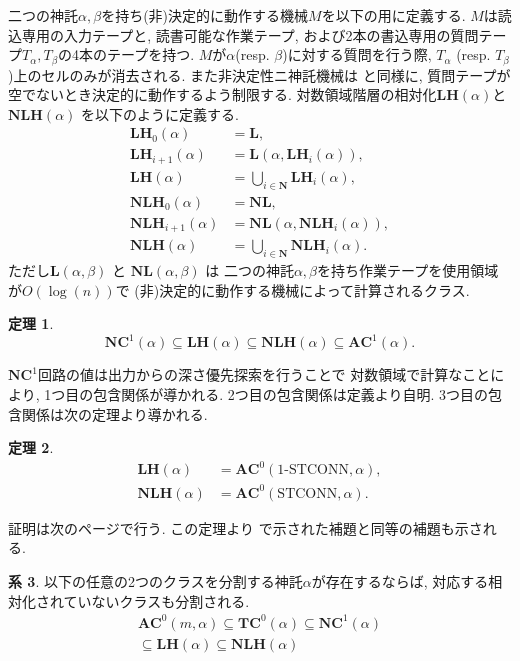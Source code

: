 \documentclass[10pt,a4paper,twocolumn]{jarticle}
\theoremstyle{definition}
\newtheorem{theorem}{定理}%
\newtheorem{corollary}[theorem]{系}
\theoremstyle{remark}
\newcommand{\N}{\mathbf N}
\newcommand{\classfont}{\mathbf}
\newcommand{\AC}{\classfont{AC}}
\newcommand{\TC}{\classfont{TC}}
\newcommand{\NC}{\classfont{NC}}
\renewcommand{\L}{\classfont{L}}
\newcommand{\NL}{\classfont{NL}}
\newcommand{\LH}{\classfont{LH}}
\newcommand{\NLH}{\classfont{NLH}}
\newcommand{\probfont}{\text}
\newcommand{\oneSTCONN}{\probfont{1-STCONN}}
\newcommand{\STCONN}{\probfont{STCONN}}
\begin{document}
二つの神託$\alpha, \beta$を持ち(非)決定的に動作する機械$M$を以下の用に定義する.
$M$は読込専用の入力テープと, 読書可能な作業テープ, 
および2本の書込専用の質問テープ$T_\alpha, T_\beta$の4本のテープを持つ.
$M$が$\alpha$(resp. $\beta$)に対する質問を行う際, 
$T_\alpha$ (resp. $T_\beta$)上のセルのみが消去される.
また非決定性ニ神託機械は \cite{ruzzo1984space} と同様に,
質問テープが空でないとき決定的に動作するよう制限する.
対数領域階層の相対化$\LH(\alpha)$と$\NLH(\alpha)$
を以下のように定義する.
\begin{align*}
 \LH_0(\alpha) &= \L,
\\
 \LH_{i+1}(\alpha) &= \L(\alpha, \LH_i(\alpha)), 
\\
 \LH(\alpha) &= \bigcup_{i \in \N} \LH_i(\alpha),
\\
 \NLH_0(\alpha) &= \NL,
\\
 \NLH_{i+1}(\alpha) &= \NL(\alpha, \NLH_i(\alpha)), 
\\
 \NLH(\alpha) &= \bigcup_{i \in \N} \NLH_i(\alpha).
\end{align*}
ただし$\L(\alpha, \beta)$ と $\NL(\alpha, \beta)$ は
二つの神託$\alpha, \beta$を持ち作業テープを使用領域が$O(\log(n))$で
(非)決定的に動作する機械によって計算されるクラス.
\begin{theorem}
\begin{equation*}
 \NC^1(\alpha) 
 \subseteq \LH(\alpha)
 \subseteq \NLH(\alpha)
 \subseteq \AC^1(\alpha).
\end{equation*}
\end{theorem}
$\NC^1$回路の値は出力からの深さ優先探索を行うことで
対数領域で計算なことにより, 1つ目の包含関係が導かれる.
2つ目の包含関係は定義より自明.
3つ目の包含関係は次の定理より導かれる.


\begin{theorem}
 \label{theorem:main1}
 \begin{align*}
 \LH(\alpha) &= \AC^0(\oneSTCONN, \alpha),
  \\
 \NLH(\alpha) &= \AC^0(\STCONN, \alpha).
 \end{align*}  
\end{theorem}


証明は次のページで行う.
この定理より \cite{aehlig2007relativizing} で示された補題と同等の補題も示される.

\begin{corollary}
\label{corollary:start}
以下の任意の2つのクラスを分割する神託$\alpha$が存在するならば,
対応する相対化されていないクラスも分割される.
\begin{gather*}
 \AC^0(m, \alpha) 
  \subseteq \TC^0(\alpha)
  \subseteq \NC^1(\alpha)
 \\
  \subseteq \LH(\alpha)
  \subseteq \NLH(\alpha)
\end{gather*}
\end{corollary}
\end{document}
